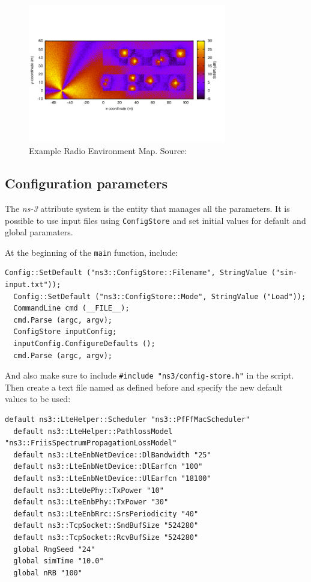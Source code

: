 \begin{figure}[h]
  \centering
  \includegraphics[width=0.77\textwidth]{img/rem.png}
  \caption{Example Radio Environment Map. Source:\cite{ns3} }
  \label{fig:rem}
\end{figure}

\subsection{Configuration parameters}
The \textit{ns-3} attribute system is the entity that manages all the parameters. It is 
possible to use input files using \texttt{ConfigStore} and set initial values for default 
and global paramaters.

At the beginning of the \texttt{main} function, include:

\begin{lstlisting}[language=myC++, caption={Configuration parameters}, captionpos=b]
  Config::SetDefault ("ns3::ConfigStore::Filename", StringValue ("sim-input.txt"));
  Config::SetDefault ("ns3::ConfigStore::Mode", StringValue ("Load"));
  CommandLine cmd (__FILE__);
  cmd.Parse (argc, argv);
  ConfigStore inputConfig;
  inputConfig.ConfigureDefaults ();
  cmd.Parse (argc, argv);
\end{lstlisting}

And also make sure to include \texttt{\#include "ns3/config-store.h"} in the script. Then create
a text file named as defined before and specify the new default values to be used:

\begin{lstlisting}[language=myshell, caption={Configuration parameters}, captionpos=b]
  default ns3::LteHelper::Scheduler "ns3::PfFfMacScheduler"
  default ns3::LteHelper::PathlossModel "ns3::FriisSpectrumPropagationLossModel"
  default ns3::LteEnbNetDevice::DlBandwidth "25"
  default ns3::LteEnbNetDevice::DlEarfcn "100"
  default ns3::LteEnbNetDevice::UlEarfcn "18100"
  default ns3::LteUePhy::TxPower "10"
  default ns3::LteEnbPhy::TxPower "30"
  default ns3::LteEnbRrc::SrsPeriodicity "40"
  default ns3::TcpSocket::SndBufSize "524280"
  default ns3::TcpSocket::RcvBufSize "524280"
  global RngSeed "24"
  global simTime "10.0"
  global nRB "100"
\end{lstlisting}
